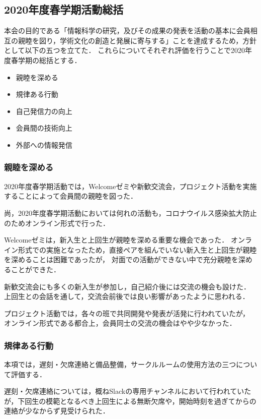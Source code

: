 \subsection*{2020年度春学期活動総括}


本会の目的である「情報科学の研究，及びその成果の発表を活動の基本に会員相互の親睦を図り，学術文化の創造と発展に寄与する」ことを達成するため，方針として以下の五つを立てた．
これらについてそれぞれ評価を行うことで2020年度春学期の総括とする．

\begin{itemize}
    \item 親睦を深める
    \item 規律ある行動
    \item 自己発信力の向上
    \item 会員間の技術向上
    \item 外部への情報発信
\end{itemize}

\subsubsection*{親睦を深める}
    2020年度春学期活動では，Welcomeゼミや新歓交流会，プロジェクト活動を実施することによって会員間の親睦を図った．

    尚，2020年度春学期活動においては何れの活動も，コロナウイルス感染拡大防止のためオンライン形式で行った．

    Welcomeゼミは，新入生と上回生が親睦を深める重要な機会であった．
    オンライン形式での実施となったため，直接ペアを組んでいない新入生と上回生が親睦を深めることは困難であったが，
    対面での活動ができない中で充分親睦を深めることができた．

    新歓交流会にも多くの新入生が参加し，自己紹介後には交流の機会も設けた．
    上回生との会話を通して，交流会前後では良い影響があったように思われる．

    プロジェクト活動では，各々の班で共同開発や発表が活発に行われていたが，
    オンライン形式である都合上，会員同士の交流の機会はやや少なかった．

\subsubsection*{規律ある行動}
    本項では，遅刻・欠席連絡と備品整備，サークルルームの使用方法の三つについて評価する．

    遅刻・欠席連絡については，概ねSlackの専用チャンネルにおいて行われていたが，下回生の模範となるべき上回生による無断欠席や，開始時刻を過ぎてからの連絡が少なからず見受けられた．

